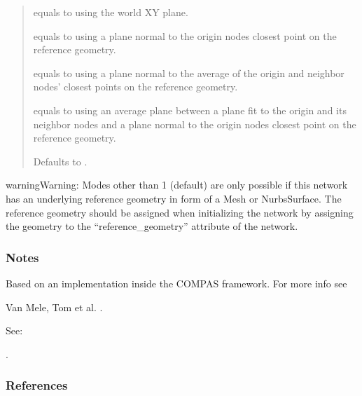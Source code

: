 \documentclass[letterpaper,10pt,english]{sphinxmanual}
\begin{document}
\begin{fulllineitems}
\begin{fulllineitems}
\begin{quote}
\begin{description}
 equals to using the world XY plane.

 equals to using a plane normal to the origin nodes closest
point on the reference geometry.

 equals to using a plane normal to the average of the origin
and neighbor nodes’ closest points on the reference geometry.

 equals to using an average plane between a plane fit to the
origin and its neighbor nodes and a plane normal to the origin
nodes closest point on the reference geometry.

Defaults to .


\end{description}\end{quote}

\begin{sphinxadmonition}{warning}{Warning:}
Modes other than \sphinxhyphen{}1 (default) are only possible if this network has an
underlying reference geometry in form of a Mesh or NurbsSurface. The
reference geometry should be assigned when initializing the network by
assigning the geometry to the “reference\_geometry” attribute of the
network.
\end{sphinxadmonition}
\subsubsection*{Notes}

Based on an implementation inside the COMPAS framework.
For more info see %
\begin{footnote}[17]\sphinxAtStartFootnote
Van Mele, Tom et al. .

See: 
%
\end{footnote}.
\subsubsection*{References}

\end{fulllineitems}



\end{fulllineitems}
\end{document}
